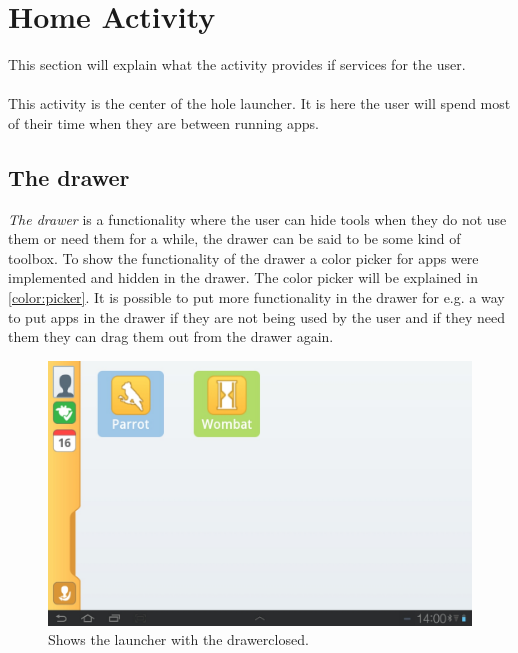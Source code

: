 \section{Home Activity}
This section will explain what the activity  provides if services for the user.\\\\
This activity is the center of the hole launcher. It is here the user will spend most of their time when they are between running apps.

\subsection{The drawer}
\textit{The drawer} is a functionality where the user can hide tools when they do not use them or need them for a while, the drawer can be said to be some kind of toolbox. To show the functionality of the drawer a color picker for apps were implemented and hidden in the drawer. The color picker will be explained in \autoref{color:picker}.
It is possible to put more functionality in the drawer for e.g. a way to put apps in the drawer if they are not being used by the user and if they need them they can drag them out from the drawer again.

\begin{figure}[h!]
	\centering
	\includegraphics[scale=0.2]{gfx/home-activity_closed}
	\caption{Shows the launcher with the drawerclosed.}
	\label{fig:home-activity_closed}
\end{figure}


